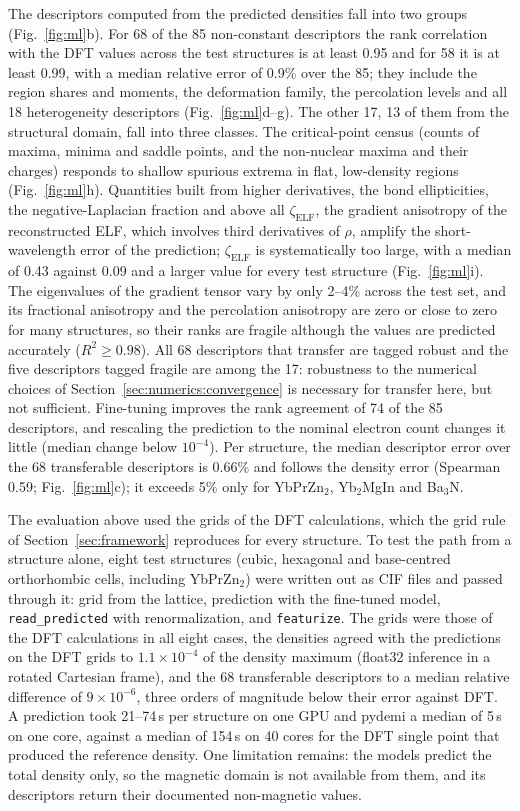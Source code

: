 \documentclass[11pt,a4paper]{article}
\begin{document}
The descriptors computed from the predicted densities fall into two groups
(Fig.~\ref{fig:ml}b). For 68 of the 85 non-constant descriptors the rank
correlation with the DFT values across the test structures is at least 0.95
and for 58 it is at least 0.99, with a median relative error of 0.9\% over the
85; they include the region shares and moments, the deformation family, the
percolation levels and all 18 heterogeneity descriptors
(Fig.~\ref{fig:ml}d--g). The other 17, 13 of them from the structural domain,
fall into three classes. The critical-point census (counts of maxima, minima and saddle
points, and the non-nuclear maxima and their charges) responds to shallow
spurious extrema in flat, low-density regions (Fig.~\ref{fig:ml}h). Quantities
built from higher derivatives, the bond ellipticities, the negative-Laplacian
fraction and above all $\zeta_{\mathrm{ELF}}$, the gradient anisotropy of the
reconstructed ELF, which involves third derivatives of $\rho$, amplify the
short-wavelength error of the prediction; $\zeta_{\mathrm{ELF}}$ is
systematically too large, with a median of 0.43 against 0.09 and a larger
value for every test structure (Fig.~\ref{fig:ml}i). The eigenvalues of the gradient tensor vary by only
2--4\% across the test set, and its fractional anisotropy and the percolation
anisotropy are zero or close to zero for many structures, so their ranks are
fragile although the values are predicted accurately ($R^2\geq0.98$). All 68
descriptors that transfer are tagged robust and the five descriptors
tagged fragile are among the 17: robustness to the numerical choices of
Section~\ref{sec:numerics:convergence} is necessary for transfer here, but not
sufficient. Fine-tuning improves the rank agreement of 74 of the 85
descriptors, and rescaling the prediction to the nominal electron count
changes it little (median change below $10^{-4}$). Per structure, the median
descriptor error over the 68 transferable descriptors is 0.66\% and follows
the density error (Spearman 0.59; Fig.~\ref{fig:ml}c); it exceeds 5\% only
for YbPrZn$_2$, Yb$_2$MgIn and Ba$_3$N.

The evaluation above used the grids of the DFT calculations, which the grid
rule of Section~\ref{sec:framework} reproduces for every structure. To test the
path from a structure alone, eight test structures (cubic, hexagonal and
base-centred orthorhombic cells, including YbPrZn$_2$) were written out as CIF
files and passed through it: grid from the lattice, prediction with the
fine-tuned model, \texttt{read\_predicted} with renormalization, and
\texttt{featurize}. The grids were those of the DFT calculations in all eight
cases, the densities agreed with the predictions on the DFT grids to
$1.1\times10^{-4}$ of the density maximum (float32 inference in a rotated
Cartesian frame), and the 68 transferable descriptors to a median relative
difference of $9\times10^{-6}$, three orders of magnitude below their error
against DFT. A prediction took 21--74\,s per structure on one GPU and pydemi a
median of 5\,s on one core, against a median of 154\,s on 40 cores for the
DFT single point that produced the reference density. One limitation remains: the models predict the total
density only, so the magnetic domain is not available from them, and its
descriptors return their documented non-magnetic values.
\end{document}
